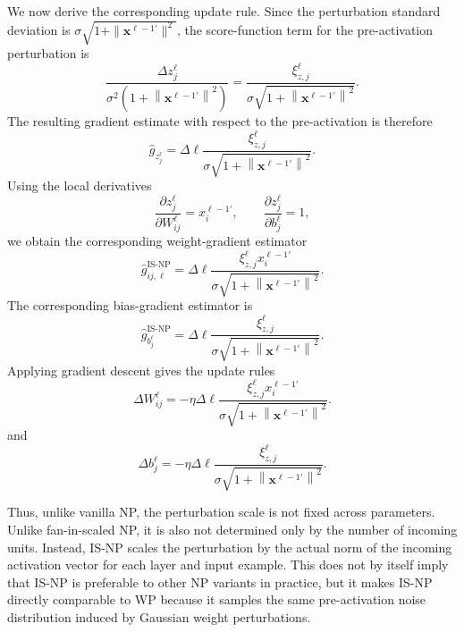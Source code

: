 We now derive the corresponding update rule. Since the perturbation standard deviation is
$\sigma \sqrt{1+\|\mathbf{x}^{\ell-1\prime}\|^2}$, the score-function term for the pre-activation perturbation is
\begin{equation}
\frac{\Delta z^\ell_j}{\sigma^2 \left(1+\left\|\mathbf{x}^{\ell-1\prime}\right\|^2\right)}
=
\frac{\xi^\ell_{z,j}}{\sigma \sqrt{1+\left\|\mathbf{x}^{\ell-1\prime}\right\|^2}}.
\end{equation}
The resulting gradient estimate with respect to the pre-activation is therefore
\begin{equation}
\hat{g}_{z^\ell_j}
=
\Delta \ell
\frac{\xi^\ell_{z,j}}{\sigma \sqrt{1+\left\|\mathbf{x}^{\ell-1\prime}\right\|^2}}.
\end{equation}
Using the local derivatives
\begin{equation}
\frac{\partial z^\ell_j}{\partial W^\ell_{ij}}
=
x^{\ell-1\prime}_i,
\qquad
\frac{\partial z^\ell_j}{\partial b^\ell_j}
=
1,
\end{equation}
we obtain the corresponding weight-gradient estimator
\begin{equation}
\hat{g}^{\mathrm{IS\text{-}NP}}_{ij,\ell}
=
\Delta \ell
\frac{\xi^\ell_{z,j} x^{\ell-1\prime}_i}
{\sigma \sqrt{1+\left\|\mathbf{x}^{\ell-1\prime}\right\|^2}}.
\label{eq:isnp_estimator}
\end{equation}
The corresponding bias-gradient estimator is
\begin{equation}
\hat{g}^{\mathrm{IS\text{-}NP}}_{b_j^\ell}
=
\Delta \ell
\frac{\xi^\ell_{z,j}}
{\sigma \sqrt{1+\left\|\mathbf{x}^{\ell-1\prime}\right\|^2}}.
\label{eq:isnp_bias_estimator}
\end{equation}
Applying gradient descent gives the update rules
\begin{equation}
\Delta W^\ell_{ij}
=
-\eta \Delta \ell
\frac{\xi^\ell_{z,j} x^{\ell-1\prime}_i}
{\sigma \sqrt{1+\left\|\mathbf{x}^{\ell-1\prime}\right\|^2}}.
\label{eq:isnp_weight_update}
\end{equation}
and
\begin{equation}
\Delta b^\ell_j
=
-\eta \Delta \ell
\frac{\xi^\ell_{z,j}}
{\sigma \sqrt{1+\left\|\mathbf{x}^{\ell-1\prime}\right\|^2}}.
\label{eq:isnp_bias_update}
\end{equation}

Thus, unlike vanilla NP, the perturbation scale is not fixed across parameters. Unlike fan-in-scaled NP, it is also not determined only by the number of incoming units. Instead, IS-NP scales the perturbation by the actual norm of the incoming activation vector for each layer and input example. This does not by itself imply that IS-NP is preferable to other NP variants in practice, but it makes IS-NP directly comparable to WP because it samples the same pre-activation noise distribution induced by Gaussian weight perturbations.

